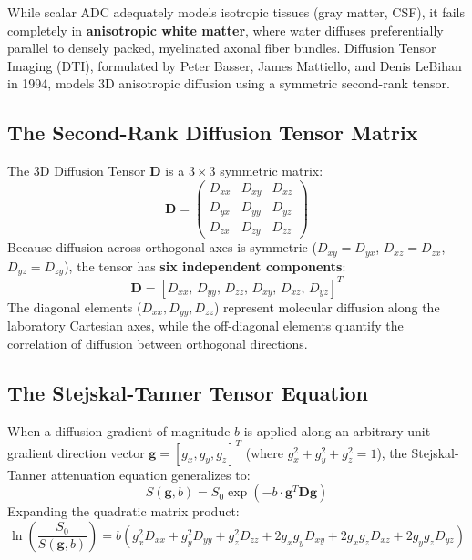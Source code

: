 \documentclass[11pt,a4paper]{article}
\begin{document}
While scalar ADC adequately models isotropic tissues (gray matter, CSF), it fails completely in \textbf{anisotropic white matter}, where water diffuses preferentially parallel to densely packed, myelinated axonal fiber bundles. Diffusion Tensor Imaging (DTI), formulated by Peter Basser, James Mattiello, and Denis LeBihan in 1994, models 3D anisotropic diffusion using a symmetric second-rank tensor.

\subsection{The Second-Rank Diffusion Tensor Matrix}

The 3D Diffusion Tensor $\mathbf{D}$ is a $3 \times 3$ symmetric matrix:
\begin{equation}
    \mathbf{D} = \begin{pmatrix} 
    D_{xx} & D_{xy} & D_{xz} \\ 
    D_{yx} & D_{yy} & D_{yz} \\ 
    D_{zx} & D_{zy} & D_{zz} 
    \end{pmatrix}
\end{equation}
Because diffusion across orthogonal axes is symmetric ($D_{xy} = D_{yx}$, $D_{xz} = D_{zx}$, $D_{yz} = D_{zy}$), the tensor has \textbf{six independent components}:
\begin{equation}
    \mathbf{D} = \left[ D_{xx}, \, D_{yy}, \, D_{zz}, \, D_{xy}, \, D_{xz}, \, D_{yz} \right]^T
\end{equation}
The diagonal elements ($D_{xx}, D_{yy}, D_{zz}$) represent molecular diffusion along the laboratory Cartesian axes, while the off-diagonal elements quantify the correlation of diffusion between orthogonal directions.

\subsection{The Stejskal-Tanner Tensor Equation}

When a diffusion gradient of magnitude $b$ is applied along an arbitrary unit gradient direction vector $\mathbf{g} = [g_x, g_y, g_z]^T$ (where $g_x^2 + g_y^2 + g_z^2 = 1$), the Stejskal-Tanner attenuation equation generalizes to:
\begin{equation}
    S(\mathbf{g}, b) = S_0 \exp\left( -b \cdot \mathbf{g}^T \mathbf{D} \mathbf{g} \right)
\end{equation}
Expanding the quadratic matrix product:
\begin{equation}
    \ln\left( \frac{S_0}{S(\mathbf{g}, b)} \right) = b \left( g_x^2 D_{xx} + g_y^2 D_{yy} + g_z^2 D_{zz} + 2 g_x g_y D_{xy} + 2 g_x g_z D_{xz} + 2 g_y g_z D_{yz} \right)
\end{equation}
\end{document}
